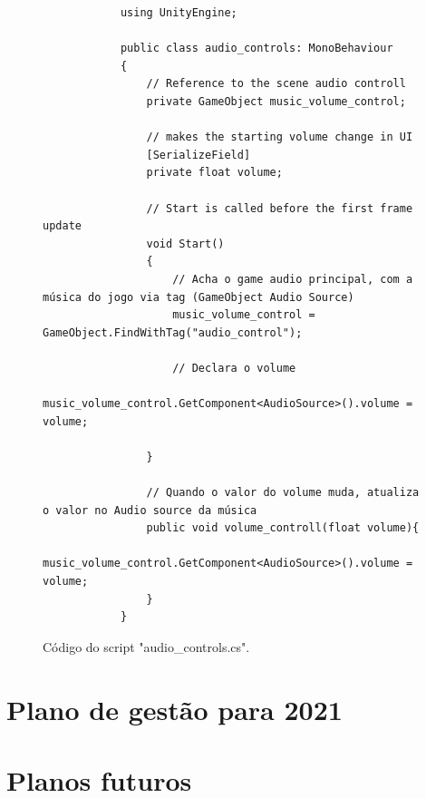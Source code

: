     \begin{figure}[h!]
        \centering
        \begin{lstlisting}
            using UnityEngine;

            public class audio_controls: MonoBehaviour
            {
                // Reference to the scene audio controll 
                private GameObject music_volume_control;

                // makes the starting volume change in UI
                [SerializeField]
                private float volume;

                // Start is called before the first frame update
                void Start()
                {
                    // Acha o game audio principal, com a música do jogo via tag (GameObject Audio Source)
                    music_volume_control = GameObject.FindWithTag("audio_control");
                    
                    // Declara o volume 
                    music_volume_control.GetComponent<AudioSource>().volume = volume;

                }

                // Quando o valor do volume muda, atualiza o valor no Audio source da música
                public void volume_controll(float volume){
                    music_volume_control.GetComponent<AudioSource>().volume = volume;
                }
            }

        \end{lstlisting}
        \label{destruction_code}
        \caption{Código do script "audio\_controls.cs".}

    \end{figure}



\chapter{Plano de gestão para 2021}

\chapter{Planos futuros}



% 
% 





